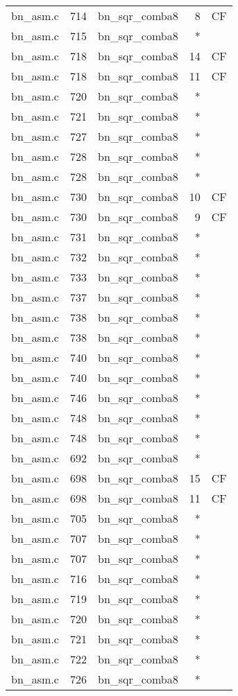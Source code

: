 \begin{table}
\begin{tabular}{lrlrr}
bn\_asm.c& 714&bn\_sqr\_comba8&8 &CF\\
bn\_asm.c& 715&bn\_sqr\_comba8&*&\\
bn\_asm.c& 718&bn\_sqr\_comba8&14&CF\\
bn\_asm.c& 718&bn\_sqr\_comba8&11&CF\\
bn\_asm.c& 720&bn\_sqr\_comba8&*&\\
bn\_asm.c& 721&bn\_sqr\_comba8&*&\\
bn\_asm.c& 727&bn\_sqr\_comba8&*&\\
bn\_asm.c& 728&bn\_sqr\_comba8&*&\\
bn\_asm.c& 728&bn\_sqr\_comba8&*&\\
bn\_asm.c& 730&bn\_sqr\_comba8&10&CF\\
bn\_asm.c& 730&bn\_sqr\_comba8&9 &CF\\
bn\_asm.c& 731&bn\_sqr\_comba8&*&\\
bn\_asm.c& 732&bn\_sqr\_comba8&*&\\
bn\_asm.c& 733&bn\_sqr\_comba8&*&\\
bn\_asm.c& 737&bn\_sqr\_comba8&*&\\
bn\_asm.c& 738&bn\_sqr\_comba8&*&\\
bn\_asm.c& 738&bn\_sqr\_comba8&*&\\
bn\_asm.c& 740&bn\_sqr\_comba8&*&\\
bn\_asm.c& 740&bn\_sqr\_comba8&*&\\
bn\_asm.c& 746&bn\_sqr\_comba8&*&\\
bn\_asm.c& 748&bn\_sqr\_comba8&*&\\
bn\_asm.c& 748&bn\_sqr\_comba8&*&\\
bn\_asm.c& 692&bn\_sqr\_comba8&*&\\
bn\_asm.c& 698&bn\_sqr\_comba8&15&CF\\
bn\_asm.c& 698&bn\_sqr\_comba8&11&CF\\
bn\_asm.c& 705&bn\_sqr\_comba8&*&\\
bn\_asm.c& 707&bn\_sqr\_comba8&*&\\
bn\_asm.c& 707&bn\_sqr\_comba8&*&\\
bn\_asm.c& 716&bn\_sqr\_comba8&*&\\
bn\_asm.c& 719&bn\_sqr\_comba8&*&\\
bn\_asm.c& 720&bn\_sqr\_comba8&*&\\
bn\_asm.c& 721&bn\_sqr\_comba8&*&\\
bn\_asm.c& 722&bn\_sqr\_comba8&*&\\
bn\_asm.c& 726&bn\_sqr\_comba8&*&\\

\end{tabular}
\end{table}
